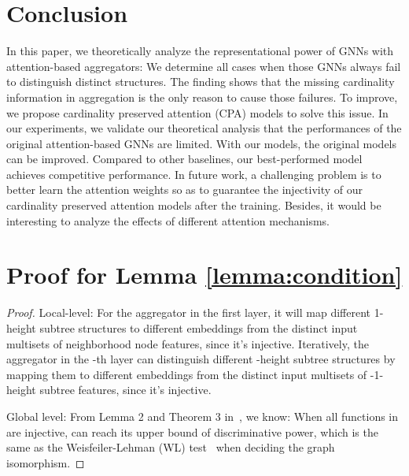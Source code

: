 \documentclass[letterpaper]{article} \usepackage{aaai20}  \usepackage{times}  \usepackage{helvet} \usepackage{courier}  \usepackage[hyphens]{url}  \usepackage{graphicx} \urlstyle{rm} \def\UrlFont{\rm}  \usepackage{graphicx}  \frenchspacing  \setlength{\pdfpagewidth}{8.5in}  \setlength{\pdfpageheight}{11in}
\theoremstyle{plain}
\theoremstyle{definition}
\begin{document}
\section{Conclusion}
In this paper, we theoretically analyze the representational power of GNNs with attention-based aggregators: We determine all cases when those GNNs always fail to distinguish distinct structures. The finding shows that the missing cardinality information in aggregation is the only reason to cause those failures. To improve, we propose cardinality preserved attention (CPA) models to solve this issue. In our experiments, we validate our theoretical analysis that the performances of the original attention-based GNNs are limited. With our models, the original models can be improved. Compared to other baselines, our best-performed model achieves competitive performance. In future work, a challenging problem is to better learn the attention weights so as to guarantee the injectivity of our cardinality preserved attention models after the training. Besides, it would be interesting to analyze the effects of different attention mechanisms.




\newpage
\appendix
\section{Proof for Lemma \ref{lemma:condition}}
\begin{proof} Local-level: For the aggregator in the first layer, it will map different 1-height subtree structures to different embeddings from the distinct input multisets of neighborhood node features, since it's injective. Iteratively, the aggregator in the -th layer can distinguish different -height subtree structures by mapping them to different embeddings from the distinct input multisets of -1-height subtree features, since it's injective.

Global level: From Lemma 2 and Theorem 3 in~\cite{xu2018how}, we know: When all functions in  are injective,  can reach its upper bound of discriminative power, which is the same as the Weisfeiler-Lehman (WL) test~\cite{weisfeiler1968reduction} when deciding the graph isomorphism. 
\end{proof}
\end{document}
